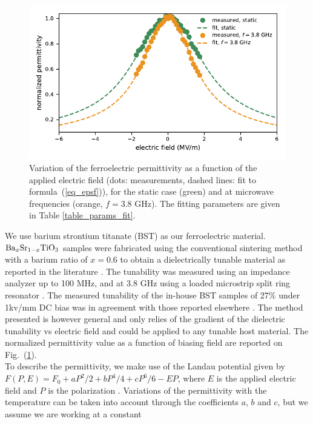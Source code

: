\documentclass[%
 aip,
 amsmath,amssymb,
 reprint,%
linenumbers
]{revtex4-1}
\newcommand{\fig}[1]{Fig.~(\ref{#1})}
\newcommand{\co}[1]{\textcolor{correction}{#1}}
\begin{document}
\begin{figure}[!t]
 \centering
 \includegraphics[width=1\columnwidth]{epsilon_fit}
 \caption{Variation of the ferroelectric permittivity as a function of the
  applied electric field (dots: measurements, dashed lines: fit to
  formula~(\ref{eq_epsf})), for the static case (green) and at microwave frequencies
  (orange, $f=3.8$ GHz). The fitting parameters are given in Table \ref{table_params_fit}.}
 \label{fig1}
\end{figure}
We use barium strontium titanate (BST) as our ferroelectric material.
\co{
${\rm Ba}_{x}{\rm Sr}_{1-x}{\rm TiO}_3$ samples were fabricated using the conventional sintering method with a barium ratio of $x = 0.6$ to obtain a dielectrically tunable material as reported in the literature \cite{agrawal_tunable_2004, hu_preparation_2015}. The tunability was measured using an impedance analyzer up to 100 MHz, and at 3.8 GHz using a loaded microstrip split ring resonator \cite{ansari_design_2015}. The measured tunability of the in-house BST samples of 27\% under 1kv/mm DC bias was in agreement with those reported elsewhere \cite{agrawal_tunable_2004, hu_preparation_2015}. The method presented is however general and only relies of the gradient of the dielectric tunability vs electric field and could be applied to any tunable host material.
The normalized permittivity value
as a function of biasing field are reported on \fig{fig1}.\\}
To describe the permittivity, we make use of the Landau potential
given by $F(P,E) = F_0 +  a P^2/2 + b P^4/4 + cP^6/6 - EP$, where $E$ is
the applied electric field and $P$ is the polarization \cite{landau_electrodynamics_2013, zhou_dielectric_2008}. Variations of the
permittivity with the temperature can be taken into account through the
coefficients $a$, $b$ and $c$, but we assume we are working at a constant
\end{document}
